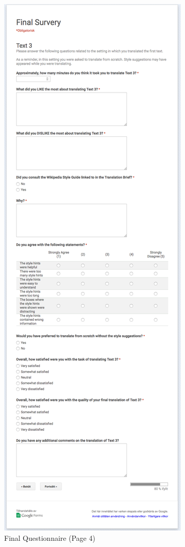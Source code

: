 \begin{figure}[h]
\myfloatalign
\includegraphics[height=\textheight]{img/final_questionnaire/final_4.png}
\caption{Final Questionnaire (Page 4)}
\end{figure}

